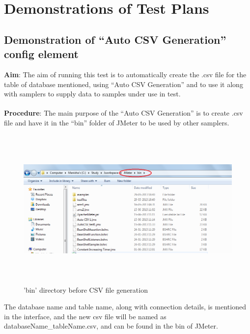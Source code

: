 \documentclass[12pt]{book}
\begin{document}
  
\chapter{Demonstrations of Test Plans}
  \section{Demonstration of ``Auto CSV Generation'' config element}
  
  \textbf{Aim}: The aim of running this test is to automatically create the .csv file for the table of database
      mentioned, using ``Auto CSV Generation'' and to use it along with samplers to supply data to
      samples under use in test.\\
      \\
  \textbf{Procedure}: The main purpose of the ``Auto CSV Generation'' is to create .csv file and have it in
      the ``bin'' folder of JMeter to be used by other samplers.

  
  \begin{figure}[H]
   \centering
   \includegraphics[width=15cm, height=8cm]{images/autocsvgeneration_81}
   \caption{'bin' directory before CSV file generation\label{fig:fig21_JMeter}}
  \end{figure}
  
  The database name and table name, along with connection details, is mentioned in the interface,
  and the new csv file will be named as databaseName\_tableName.csv, and can be found in the bin
  of JMeter.\\
  
\end{document}
